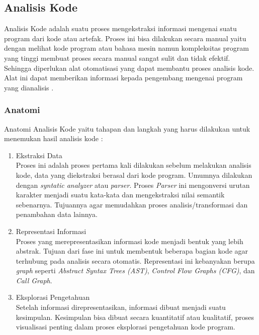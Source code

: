 \subsection{Analisis Kode}
Analisis Kode adalah suatu proses mengekstraksi informasi mengenai suatu program dari kode atau artefak. Proses ini bisa dilakukan secara manual yaitu dengan melihat kode program atau bahasa mesin namun kompleksitas program yang tinggi membuat proses secara manual sangat sulit dan tidak efektif. Sehingga diperlukan alat otomatisasi yang dapat membantu proses analisis kode. Alat ini dapat memberikan informasi kepada pengembang mengenai program yang dianalisis \cite{208}. 

\subsubsection{Anatomi} 
Anatomi Analisis Kode yaitu tahapan dan langkah yang harus dilakukan untuk menemukan hasil analisis kode \cite{208}:
\begin{enumerate}[leftmargin=1.3cm]
	\item Ekstraksi Data\\
	Proses ini adalah proses pertama kali dilakukan sebelum melakukan analisis kode, data yang diekstraksi berasal dari kode program. Umumnya dilakukan dengan \textit{syntatic analyzer} atau \textit{parser}. Proses \textit{Parser} ini mengonversi urutan karakter menjadi suatu kata-kata dan mengekstraksi nilai semantik sebenarnya. Tujuannya agar memudahkan proses analisis/transformasi dan penambahan data lainnya.
	\item Representasi Informasi\\
	Proses yang merepresentasikan informasi kode menjadi bentuk yang lebih abstrak. Tujuan dari fase ini untuk membentuk beberapa bagian kode agar terhubung pada analisis secara otomatis. Representasi ini kebanyakan berupa \textit{graph} seperti \textit{Abstract Syntax Trees (AST)}, \textit{Control Flow Graphs (CFG)}, dan \textit{Call Graph}.
	\item Eksplorasi Pengetahuan\\
	Setelah informasi direpresentasikan, informasi dibuat menjadi suatu kesimpulan. Kesimpulan bisa dibuat secara kuantitatif atau kualitatif, proses visualisasi penting dalam proses eksplorasi pengetahuan kode program.
\end{enumerate}


